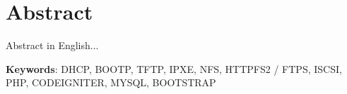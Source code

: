 \chapter*{Abstract}
Abstract in English...

\vfill
\textbf{Keywords}: DHCP, BOOTP, TFTP, IPXE, NFS, HTTPFS2 / FTPS, ISCSI, PHP, CODEIGNITER, MYSQL, BOOTSTRAP
